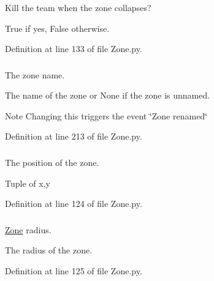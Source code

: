 Kill the team when the zone collapses? 

True if yes, False otherwise. 

Definition at line 133 of file Zone.py.

\hypertarget{class_zone_1_1_zone_ad03356df7f4de16fb473ba7bd8fbe2c8}{
\subsubsection[{name}]{}}
\label{class_zone_1_1_zone_ad03356df7f4de16fb473ba7bd8fbe2c8}


The zone name. 

The name of the zone or None if the zone is unnamed. \begin{DoxyNote}{Note}
Changing this triggers the event \char`\"{}Zone renamed\char`\"{} 
\end{DoxyNote}


Definition at line 213 of file Zone.py.

\hypertarget{class_zone_1_1_zone_ae30b162378f40661dfcb854ec7926bdb}{
\subsubsection[{position}]{}}
\label{class_zone_1_1_zone_ae30b162378f40661dfcb854ec7926bdb}


The position of the zone. 

Tuple of x,y 

Definition at line 124 of file Zone.py.

\hypertarget{class_zone_1_1_zone_a6ee5fd031ade8ecb6b2f41455ad309c4}{
\subsubsection[{radius}]{}}
\label{class_zone_1_1_zone_a6ee5fd031ade8ecb6b2f41455ad309c4}


\hyperlink{class_zone_1_1_zone}{Zone} radius. 

The radius of the zone. 

Definition at line 125 of file Zone.py.

